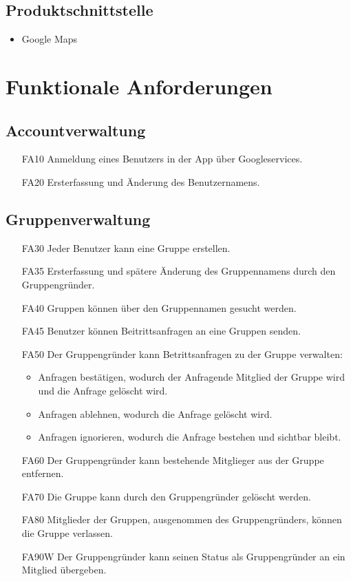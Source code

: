 \documentclass{scrartcl}
\begin{document}
		\subsection{Produktschnittstelle}
		\begin{itemize}	        
		\item Google Maps
		\end{itemize}
	\newpage


	\section{Funktionale Anforderungen}
		

		\subsection{Accountverwaltung}
		\begin{itemize}
		\item[FA10] Anmeldung eines Benutzers in der App über Googleservices.
		\item[FA20] Ersterfassung und Änderung des Benutzernamens.
		\end{itemize}
		
		\subsection{Gruppenverwaltung}
		\begin{itemize}
		\item[FA30] Jeder Benutzer kann eine Gruppe erstellen.
		\item[FA35] Ersterfassung und spätere Änderung des Gruppennamens durch den Gruppengründer.
		\item[FA40] Gruppen können über den Gruppennamen gesucht werden.
		\item[FA45] Benutzer können Beitrittsanfragen an eine Gruppen senden.
		\item[FA50]Der Gruppengründer kann Betrittsanfragen zu der Gruppe verwalten:
			\begin{itemize}
			\item Anfragen bestätigen, wodurch der Anfragende Mitglied der Gruppe wird und die Anfrage gelöscht wird.
			\end{itemize}
			\begin{itemize}
			\item Anfragen ablehnen, wodurch die Anfrage gelöscht wird.
			\end{itemize}
			\begin{itemize}
			\item Anfragen ignorieren, wodurch die Anfrage bestehen und sichtbar bleibt.
			\end{itemize}
		 \item[FA60] Der Gruppengründer kann bestehende Mitglieger aus der Gruppe entfernen.
		 \item[FA70] Die Gruppe kann durch den Gruppengründer gelöscht werden.
		 \item[FA80] Mitglieder der Gruppen, ausgenommen des Gruppengründers, können die Gruppe verlassen.
		 \item[FA90W] Der Gruppengründer kann seinen Status als Gruppengründer an ein Mitglied übergeben.
		\end{itemize}
		
\end{document}
